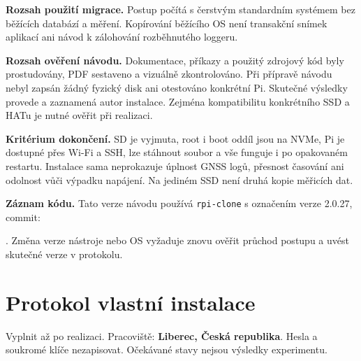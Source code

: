 \documentclass[11pt,a4paper]{article}
\newcounter{postup}
\begin{document}
\textbf{Rozsah použití migrace.} Postup počítá s čerstvým standardním systémem bez běžících databází a měření. Kopírování běžícího OS není transakční snímek aplikací ani návod k zálohování rozběhnutého loggeru.

\textbf{Rozsah ověření návodu.} Dokumentace, příkazy a použitý zdrojový kód byly prostudovány, PDF sestaveno a vizuálně zkontrolováno. Při přípravě návodu nebyl zapsán žádný fyzický disk ani otestováno konkrétní Pi. Skutečné výsledky provede a zaznamená autor instalace. Zejména kompatibilitu konkrétního SSD a HATu je nutné ověřit při realizaci.

\textbf{Kritérium dokončení.} SD je vyjmuta, root i boot oddíl jsou na NVMe, Pi je dostupné přes Wi-Fi a SSH, lze stáhnout soubor a vše funguje i po opakovaném restartu. Instalace sama neprokazuje úplnost GNSS logů, přesnost časování ani odolnost vůči výpadku napájení. Na jediném SSD není druhá kopie měřicích dat.

\textbf{Záznam kódu.} Tato verze návodu používá \texttt{rpi-clone} s označením verze 2.0.27, commit:\par
{}.\cite{clone-code}
Změna verze nástroje nebo OS vyžaduje znovu ověřit průchod postupu a uvést skutečné verze v protokolu.

\clearpage
\section{Protokol vlastní instalace}
Vyplnit až po realizaci. Pracoviště: \textbf{Liberec, Česká republika}. Hesla a soukromé klíče nezapisovat. Očekávané stavy nejsou výsledky experimentu.
\end{document}
